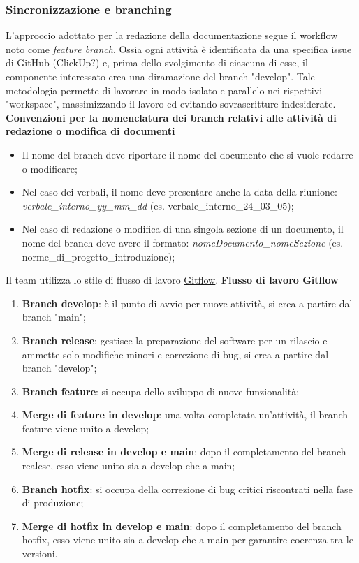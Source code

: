 \subsubsection{Sincronizzazione e branching}

L'approccio adottato per la redazione della documentazione segue il workflow noto come \textit{feature branch}.
Ossia ogni attività è identificata da una specifica issue di GitHub (ClickUp?) e, prima dello svolgimento di
ciascuna di esse, il componente interessato crea una diramazione del branch "develop". Tale metodologia
permette di lavorare in modo isolato e parallelo nei rispettivi "workspace", massimizzando il lavoro ed evitando sovrascritture indesiderate.
\textbf{Convenzioni per la nomenclatura dei branch relativi alle attività di redazione o modifica di documenti} \label{convenzioni_nomenclatura}
\begin{itemize}
	\item Il nome del branch deve riportare il nome del documento che si vuole redarre o modificare;
	\item Nel caso dei verbali, il nome deve presentare anche la data della riunione: \textit{verbale\_interno\_yy\_mm\_dd} (es. verbale\_interno\_24\_03\_05);
	\item Nel caso di redazione o modifica di una singola sezione di un documento, il nome del branch deve avere il formato:
	      \textit{nomeDocumento\_nomeSezione} (es. norme\_di\_progetto\_introduzione);
\end{itemize}

Il team utilizza lo stile di flusso di lavoro \href{https://www.atlassian.com/it/git/tutorials/comparing-workflows/gitflow-workflow}{\underline{{Gitflow}}}.
\textbf{Flusso di lavoro Gitflow}
\begin{enumerate}
	\item \textbf{Branch develop}: è il punto di avvio per nuove attività, si crea a partire dal branch "main";
	\item \textbf{Branch release}: gestisce la preparazione del software per un rilascio e ammette solo
	      modifiche minori e correzione di bug, si crea a partire dal branch "develop";
	\item \textbf{Branch feature}: si occupa dello sviluppo di nuove funzionalità;
	\item \textbf{Merge di feature in develop}: una volta completata un'attività, il branch feature viene
	      unito a develop;
	\item \textbf{Merge di release in develop e main}: dopo il completamento del branch realese, esso viene
	      unito sia a develop che a main;
	\item \textbf{Branch hotfix}: si occupa della correzione di bug critici riscontrati nella fase di produzione;
	\item \textbf{Merge di hotfix in develop e main}: dopo il completamento del branch hotfix, esso viene
	      unito sia a develop che a main per garantire coerenza tra le versioni.
\end{enumerate}

